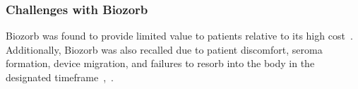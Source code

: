 \subsubsection{Challenges with Biozorb\label{sec:literatureReview:currentMethods:challengeswithcurrentdevicesandmethods:biozorb}}
Biozorb was found to provide limited value to patients relative to its high cost~\cite{RefWorks:RefID:344-mitchell2019adaptable}. Additionally, Biozorb was also recalled due to patient discomfort, seroma formation, device migration, and failures to resorb into the body in the designated timeframe~\cite{RefWorks:RefID:296-2024hologic},~\cite{RefWorks:RefID:28-nudelunited}.
